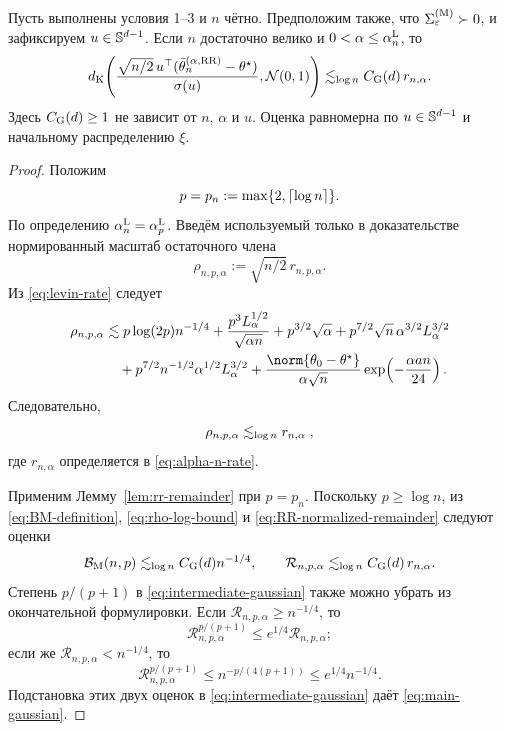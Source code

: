 \begin{theorem}
\label{thm:gaussian}
Пусть выполнены условия 1--3 и $n$ чётно. Предположим также, что
$\Sigma^{(\mathrm{M})}_\varepsilon\succ0$, и зафиксируем $u\in\mathbb{S}^{d-1}$.
Если $n$ достаточно велико и $0<\alpha\leq\alpha_n^{\rm L}$,
то
\begin{equation}\label{eq:main-gaussian}
 d_{\mathrm K}\!\left(
  \frac{\sqrt{n/2}\,u^\top
   (\bar{\theta}_n^{(\alpha,\mathrm{RR})}-\theta^\star)}{\sigma(u)},
  \mathcal{N}(0,1)\right)
 \lesssim_{\log{n}} C_{\rm G}(d)\,r_{n,\alpha}.
\end{equation}
Здесь $C_{\rm G}(d)\geq1$ не зависит от $n$, $\alpha$ и $u$.
Оценка равномерна по $u\in\mathbb{S}^{d-1}$ и начальному распределению $\xi$.
\end{theorem}

\begin{proof}
Положим
\[
 p=p_n:=\max\{2,\left\lceil \log n \right\rceil\}.
\]
По определению
$\alpha_n^{\rm L}=\alpha_p^{\rm L}$. Введём используемый только в доказательстве
нормированный масштаб остаточного члена
\begin{equation}\label{eq:rho-rate}
 \rho_{n,p,\alpha}:=\sqrt{n/2}\,r_{n,p,\alpha}.
\end{equation}
Из \eqref{eq:levin-rate} следует
\begin{align}\label{eq:rho-rate-expanded}
 \rho_{n,p,\alpha}
 &\lesssim p\log(2p)n^{-1/4}
 +\frac{p^3L_\alpha^{1/2}}{\sqrt{\alpha n}}
 +p^{3/2}\sqrt\alpha
 +p^{7/2}\sqrt n\,\alpha^{3/2}L_\alpha^{3/2}\notag\\
 &\quad
 +p^{7/2}n^{-1/2}\alpha^{1/2}L_\alpha^{3/2}
 +\frac{\norm{\thetainit-\thetalim}}{\alpha\sqrt n}
   \exp\!\left(-\frac{\alpha an}{24}\right).
\end{align}
Следовательно,
\begin{equation}\label{eq:rho-log-bound}
 \rho_{n,p,\alpha}
 \lesssim_{\log{n}}r_{n,\alpha} \;,
\end{equation}
где $r_{n,\alpha}$ определяется в \eqref{eq:alpha-n-rate}.

Применим Лемму~\ref{lem:rr-remainder} при $p=p_n$. Поскольку
$p\geq\log n$,
из \eqref{eq:BM-definition}, \eqref{eq:rho-log-bound} и
\eqref{eq:RR-normalized-remainder} следуют оценки
\begin{equation}\label{eq:log-moment-rates}
 \mathcal B_{\rm M}(n,p)
 \lesssim_{\log{n}} C_{\rm G}(d)n^{-1/4},
 \qquad
 \mathcal R_{n,p,\alpha}
 \lesssim_{\log{n}} C_{\rm G}(d)\,r_{n,\alpha}.
\end{equation}
Степень $p/(p+1)$ в \eqref{eq:intermediate-gaussian} также можно убрать из
окончательной формулировки. Если
$\mathcal R_{n,p,\alpha}\geq n^{-1/4}$, то
\[
 \mathcal R_{n,p,\alpha}^{p/(p+1)}
 \leq e^{1/4}\mathcal R_{n,p,\alpha};
\]
если же $\mathcal R_{n,p,\alpha}<n^{-1/4}$, то
\[
 \mathcal R_{n,p,\alpha}^{p/(p+1)}
 \leq n^{-p/(4(p+1))}
 \leq e^{1/4}n^{-1/4}.
\]
Подстановка этих двух оценок в \eqref{eq:intermediate-gaussian} даёт
\eqref{eq:main-gaussian}.
\end{proof}

